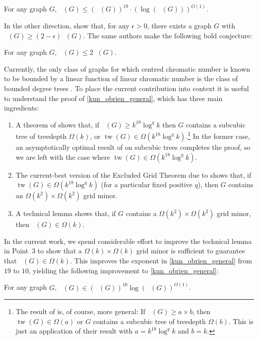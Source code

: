 \documentclass{patmorin}
\DeclareMathOperator{\tw}{tw}
\DeclareMathOperator{\chicen}{\chi_{\mathrm{cen}}}
\DeclareMathOperator{\chilin}{\chi_{\mathrm{lin}}}
\begin{document}
\begin{thm}\label{kun_obrien_general}
  For any graph $G$, $\chicen(G)\le (\chilin(G))^{19}\cdot(\log(\chilin(G)))^{O(1)}$.
\end{thm}

In the other direction, \citet{kun.obrien.ea:polynomial} show that, for any $\epsilon >0$, there exists a graph $G$ with $\chicen(G) \ge (2-\epsilon)\chilin(G)$.  The same authors make the following bold conjecture:

\begin{conj}\label{crazy_conjecture}
  For any graph $G$, $\chicen(G)\le 2\chilin(G)$.
\end{conj}

Currently, the only class of graphs for which centred chromatic number is known to be bounded by a linear function of linear chromatic number is the class of bounded degree trees \cite[Theorem~4]{kun.obrien.ea:polynomial}.  To place the current contribution into context it is useful to understand the proof of \cref{kun_obrien_general}, which has three main ingredients:
\begin{enumerate}
  \item A theorem of \citet{czerwinski.nadara.ea:improved} shows that, if $\chicen(G)\ge k^{19}\log^{q} k$ then $G$ contains a subcubic tree of treedepth $\Omega(k)$, or $\tw(G)\in\Omega(k^{18}\log^q k)$.\footnote{The result of \citet{czerwinski.nadara.ea:improved} is, of course, more general:  If $\chicen(G)\ge a\times b$, then $\tw(G)\in\Omega(a)$ or $G$ contains a subcubic tree of treedepth $\Omega(b)$. This is just an application of their result with $a=k^{18}\log^q k$ and $b=k$.}  In the former case, an asymptotically optimal result of \citet{kun.obrien.ea:polynomial} on subcubic trees completes the proof, so we are left with the case where $\tw(G)\in\Omega(k^{18}\log^q k)$.
  \item The current-best version of the Excluded Grid Theorem due to \citet{chuzhoy.tan:towards} shows that, if $\tw(G)\in\Omega(k^{18}\log^q k)$ (for a particular fixed positive $q$), then $G$ contains an $\Omega(k^2)\times \Omega(k^2)$ grid minor.
  \item A technical lemma \cite[Lemma~5]{kun.obrien.ea:polynomial} shows that, if $G$ contains a $\Omega(k^2)\times \Omega(k^2)$ grid minor, then $\chilin(G)\in\Omega(k)$.
\end{enumerate}

In the current work, we spend considerable effort to improve the technical lemma in Point~3 to show that a $\Omega(k)\times\Omega(k)$ grid minor is sufficient to guarantee that $\chilin(G)\in\Omega(k)$. This improves the exponent in \cref{kun_obrien_general} from $19$ to $10$, yielding the following improvement to \cref{kun_obrien_general}:
\begin{thm}\label{kun_obrien_general2}
  For any graph $G$, $\chicen(G)\in (\chilin(G))^{10}\log(\chilin(G))^{O(1)}$.
\end{thm}
\end{document}
